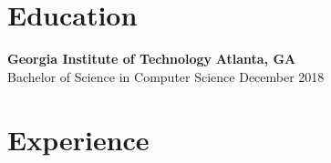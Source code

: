 \documentclass[line]{resume}
\begin{document}
\begin{center}
\end{center}
\vspace{-1mm}
\section{Education}
\textbf{Georgia Institute of Technology} \hfill \textbf{Atlanta, GA} \\
Bachelor of Science in Computer Science  \hfill December 2018

\vspace{-3px}
\section{Experience}
\vspace{-1px}
\end{document}
